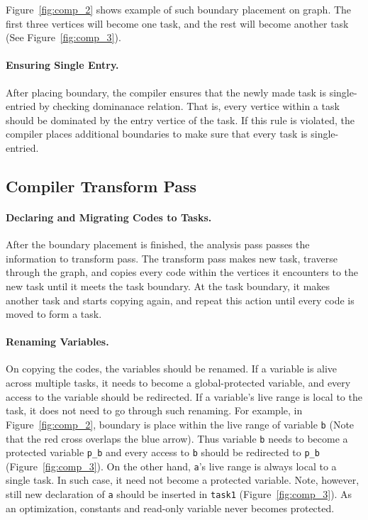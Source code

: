 Figure~\ref{fig:comp_2} shows example of such boundary placement on graph. The first three vertices will become one task, and the rest will become another task (See Figure~\ref{fig:comp_3}).

\paragraph{Ensuring Single Entry.} 

After placing boundary, the compiler ensures that the newly made task is single-entried by checking dominanace relation. That is, every vertice within
a task should be dominated by the entry vertice of the task. If this rule is violated, the compiler places additional boundaries to make sure that every
task is single-entried.

\subsection{Compiler Transform Pass}
\label{sec:compiler_transform_pass}

\paragraph{Declaring and Migrating Codes to Tasks.} 

After the boundary placement is finished, the analysis pass passes the information to transform pass.
The transform pass makes new task, traverse through the graph, and copies every code within the vertices it
encounters to the new task until it meets the task boundary. At the task boundary, it makes another task and
starts copying again, and repeat this action until every code is moved to form a task.

\paragraph{Renaming Variables.} 

On copying the codes, the variables should be renamed. If a variable is alive across multiple tasks,
it needs to become a global-protected variable, and every access to the variable should be redirected.
If a variable's live range is local to the task, it does not need to go through such renaming.
For example, in Figure~\ref{fig:comp_2}, boundary is place
within the live range of variable {\tt b} (Note that the red cross overlaps the blue arrow). Thus variable {\tt b}
needs to become a protected variable {\tt p\_b} and every access to {\tt b} should be redirected to {\tt p\_b} (Figure~\ref{fig:comp_3}).
On the other hand, {\tt a}'s live range is always local to a single task. In such case, it need not become a protected variable.
Note, however, still new declaration of {\tt a} should be inserted in {\tt task1} (Figure~\ref{fig:comp_3}).
As an optimization, constants and read-only variable never becomes protected.

